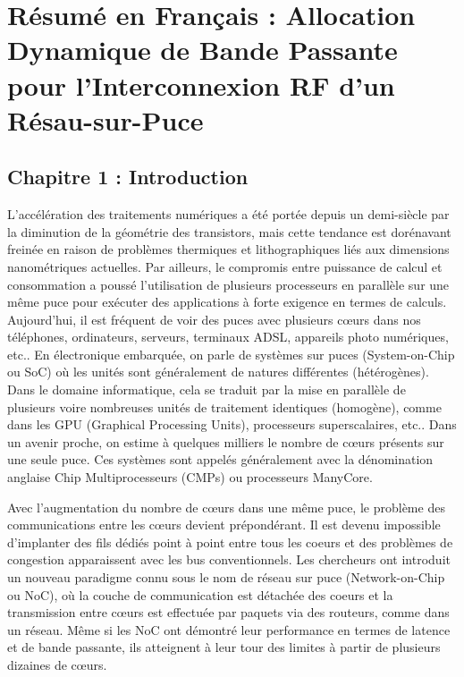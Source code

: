 
\chapter{Résumé en Français : Allocation Dynamique de Bande Passante pour l'Interconnexion RF d'un Résau-sur-Puce} %

\label{Chapter0} %




\section*{Chapitre 1 : Introduction}

L’accélération des traitements numériques a été portée depuis un demi-siècle par la diminution de la géométrie des transistors, mais cette tendance est dorénavant freinée en raison de problèmes thermiques et lithographiques liés aux dimensions nanométriques actuelles. Par ailleurs, le compromis entre puissance de calcul et consommation a poussé l'utilisation de plusieurs processeurs en parallèle sur une même puce pour exécuter des applications à forte exigence en termes de calculs. Aujourd'hui, il est fréquent de voir des puces avec plusieurs cœurs dans nos téléphones, ordinateurs, serveurs, terminaux ADSL, appareils photo numériques, etc.. En électronique embarquée, on parle de systèmes sur puces (System-on-Chip ou SoC) où les unités sont généralement de natures différentes (hétérogènes). Dans le domaine informatique, cela se traduit par la mise en parallèle de plusieurs voire nombreuses unités de traitement identiques (homogène), comme dans les GPU (Graphical Processing Units), processeurs superscalaires, etc.. Dans un avenir proche, on estime à quelques milliers le nombre de cœurs présents sur une seule puce. Ces systèmes sont appelés généralement avec la dénomination anglaise Chip Multiprocesseurs (CMPs) ou processeurs ManyCore.


Avec l'augmentation du nombre de cœurs dans une même puce, le problème des communications entre les cœurs devient prépondérant. Il est devenu impossible d'implanter des fils dédiés point à point entre tous les coeurs et des problèmes de congestion apparaissent avec les bus conventionnels. Les chercheurs ont introduit un nouveau paradigme connu sous le nom de réseau sur puce (Network-on-Chip ou NoC), où la couche de communication est détachée des coeurs et la transmission entre cœurs est effectuée par paquets via des routeurs, comme dans un réseau. Même si les  NoC ont démontré leur performance en termes de latence et de bande passante, ils atteignent à leur tour des limites à partir de plusieurs dizaines de cœurs. 

